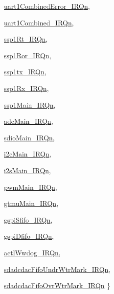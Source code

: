 \begin{DoxyCompactItemize}
\par
\hyperlink{a00468_a666eb0caeb12ec0e281415592ae89083ab34a916fd6f0c4c6401ea6aaec58c7db}{uart1CombinedError\_\-IRQn}, 
\par
\hyperlink{a00468_a666eb0caeb12ec0e281415592ae89083adc228ac7e76bbffb26289ae933f51799}{uart1Combined\_\-IRQn}, 
\par
\hyperlink{a00468_a666eb0caeb12ec0e281415592ae89083a1b6b55ceb7fa63135b84c6d22481f17b}{ssp1Rt\_\-IRQn}, 
\par
\hyperlink{a00468_a666eb0caeb12ec0e281415592ae89083a987b51256a571de7f9f64a49d7e3bac8}{ssp1Ror\_\-IRQn}, 
\par
\hyperlink{a00468_a666eb0caeb12ec0e281415592ae89083a596189b67707ff1da68584a310d6d345}{ssp1tx\_\-IRQn}, 
\par
\hyperlink{a00468_a666eb0caeb12ec0e281415592ae89083a7b197e153ad8ffe35c6085888e2b60c4}{ssp1Rx\_\-IRQn}, 
\par
\hyperlink{a00468_a666eb0caeb12ec0e281415592ae89083ad4402ab58a773fc6f62f31c629dcd99e}{ssp1Main\_\-IRQn}, 
\par
\hyperlink{a00468_a666eb0caeb12ec0e281415592ae89083a8830a6b94c0e50a6cc8f458798707bd9}{adcMain\_\-IRQn}, 
\par
\hyperlink{a00468_a666eb0caeb12ec0e281415592ae89083ab642ce3e74bc0cda390d61da6c6e30be}{sdioMain\_\-IRQn}, 
\par
\hyperlink{a00468_a666eb0caeb12ec0e281415592ae89083a196a3d27eb755dbcd72ad82453e74319}{i2cMain\_\-IRQn}, 
\par
\hyperlink{a00468_a666eb0caeb12ec0e281415592ae89083a945c2d9fdbc070d29dc0ed4529b2a43b}{i2sMain\_\-IRQn}, 
\par
\hyperlink{a00468_a666eb0caeb12ec0e281415592ae89083a8242768f721f9dcab63d51a8b198cb99}{pwmMain\_\-IRQn}, 
\par
\hyperlink{a00468_a666eb0caeb12ec0e281415592ae89083aa7958e3c067de4c6e4c225b25869aee4}{gtmuMain\_\-IRQn}, 
\par
\hyperlink{a00468_a666eb0caeb12ec0e281415592ae89083adf51eee455fcd5475a558e97b1fc3030}{gspiSfifo\_\-IRQn}, 
\par
\hyperlink{a00468_a666eb0caeb12ec0e281415592ae89083adce61c61aee5b4baf82bf16bd17356f6}{gspiDfifo\_\-IRQn}, 
\par
\hyperlink{a00468_a666eb0caeb12ec0e281415592ae89083a2c6545bcfc491bab38b1fe7654ae653b}{actlWwdog\_\-IRQn}, 
\par
\hyperlink{a00468_a666eb0caeb12ec0e281415592ae89083a33f970a538422af72e861b7436f6d5cd}{sdadcdacFifoUndrWtrMark\_\-IRQn}, 
\par
\hyperlink{a00468_a666eb0caeb12ec0e281415592ae89083adcab7d4779a1b3a0bbb86016e96a6f19}{sdadcdacFifoOvrWtrMark\_\-IRQn}
 \}
\end{DoxyCompactItemize}


